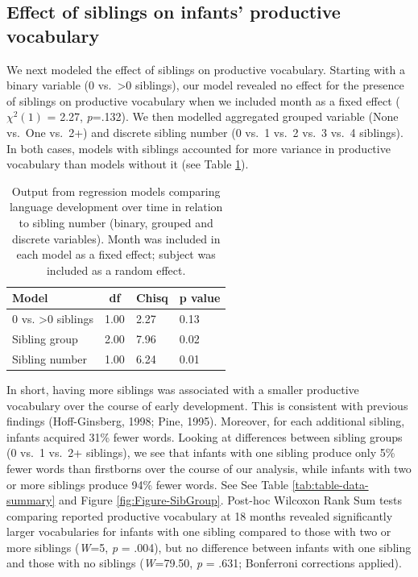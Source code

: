 \documentclass[man,floatsintext]{apa6}
\begin{document}
\hypertarget{effect-of-siblings-on-infants-productive-vocabulary}{%
\subsection{Effect of siblings on infants' productive vocabulary}\label{effect-of-siblings-on-infants-productive-vocabulary}}

We next modeled the effect of siblings on productive vocabulary. Starting with a binary variable (0 vs.~\textgreater{}0 siblings), our model revealed no effect for the presence of siblings on productive vocabulary when we included month as a fixed effect (\(\chi^2 (1)\) = 2.27, \emph{p}=.132). We then modelled aggregated grouped variable (None vs.~One vs.~2+) and discrete sibling number (0 vs.~1 vs.~2 vs.~3 vs.~4 siblings). In both cases, models with siblings accounted for more variance in productive vocabulary than models without it (see Table \ref{tab:table-sibling-model-output}).

\begin{table}[H]
\begin{center}
\begin{threeparttable}
\caption{\label{tab:table-sibling-model-output}Output from regression models comparing language development over time in relation to sibling number (binary, grouped and discrete variables). Month was included in each model as a fixed effect; subject was included as a random effect.}
\small{
\begin{tabular}{llll}
\toprule
Model & \multicolumn{1}{c}{df} & \multicolumn{1}{c}{Chisq} & \multicolumn{1}{c}{p value}\\
\midrule
0 vs. >0 siblings & 1.00 & 2.27 & 0.13\\
Sibling group & 2.00 & 7.96 & 0.02\\
Sibling number & 1.00 & 6.24 & 0.01\\
\bottomrule
\end{tabular}
}
\end{threeparttable}
\end{center}
\end{table}

In short, having more siblings was associated with a smaller productive vocabulary over the course of early development. This is consistent with previous findings (Hoff-Ginsberg, 1998; Pine, 1995). Moreover, for each additional sibling, infants acquired 31\% fewer words. Looking at differences between sibling groups (0 vs.~1 vs.~2+ siblings), we see that infants with one sibling produce only 5\% fewer words than firstborns over the course of our analysis, while infants with two or more siblings produce 94\% fewer words. See See Table \ref{tab:table-data-summary} and Figure \ref{fig:Figure-SibGroup}. Post-hoc Wilcoxon Rank Sum tests comparing reported productive vocabulary at 18 months revealed significantly larger vocabularies for infants with one sibling compared to those with two or more siblings (\emph{W}=5, \emph{p} = .004), but no difference between infants with one sibling and those with no siblings (\emph{W}=79.50, \emph{p} = .631; Bonferroni corrections applied).
\end{document}
